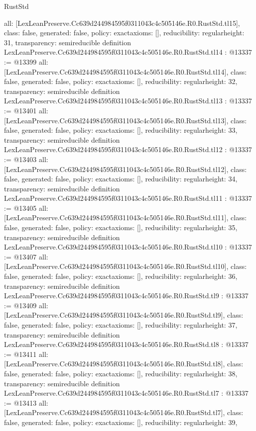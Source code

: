 \begin{lexlean}{RustStd}
\begin{coremodule}
{  all: [LexLeanPreserve.Cc639d244984595f0311043c4c505146e.R0.RustStd.tl15],
  class: false,
  generated: false,
  policy: exact{axioms: []},
  reducibility: regular{height: 31},
  transparency: semireducible
}
definition LexLeanPreserve.Cc639d244984595f0311043c4c505146e.R0.RustStd.tl14 : @13337 := @13399 {
  all: [LexLeanPreserve.Cc639d244984595f0311043c4c505146e.R0.RustStd.tl14],
  class: false,
  generated: false,
  policy: exact{axioms: []},
  reducibility: regular{height: 32},
  transparency: semireducible
}
definition LexLeanPreserve.Cc639d244984595f0311043c4c505146e.R0.RustStd.tl13 : @13337 := @13401 {
  all: [LexLeanPreserve.Cc639d244984595f0311043c4c505146e.R0.RustStd.tl13],
  class: false,
  generated: false,
  policy: exact{axioms: []},
  reducibility: regular{height: 33},
  transparency: semireducible
}
definition LexLeanPreserve.Cc639d244984595f0311043c4c505146e.R0.RustStd.tl12 : @13337 := @13403 {
  all: [LexLeanPreserve.Cc639d244984595f0311043c4c505146e.R0.RustStd.tl12],
  class: false,
  generated: false,
  policy: exact{axioms: []},
  reducibility: regular{height: 34},
  transparency: semireducible
}
definition LexLeanPreserve.Cc639d244984595f0311043c4c505146e.R0.RustStd.tl11 : @13337 := @13405 {
  all: [LexLeanPreserve.Cc639d244984595f0311043c4c505146e.R0.RustStd.tl11],
  class: false,
  generated: false,
  policy: exact{axioms: []},
  reducibility: regular{height: 35},
  transparency: semireducible
}
definition LexLeanPreserve.Cc639d244984595f0311043c4c505146e.R0.RustStd.tl10 : @13337 := @13407 {
  all: [LexLeanPreserve.Cc639d244984595f0311043c4c505146e.R0.RustStd.tl10],
  class: false,
  generated: false,
  policy: exact{axioms: []},
  reducibility: regular{height: 36},
  transparency: semireducible
}
definition LexLeanPreserve.Cc639d244984595f0311043c4c505146e.R0.RustStd.tl9 : @13337 := @13409 {
  all: [LexLeanPreserve.Cc639d244984595f0311043c4c505146e.R0.RustStd.tl9],
  class: false,
  generated: false,
  policy: exact{axioms: []},
  reducibility: regular{height: 37},
  transparency: semireducible
}
definition LexLeanPreserve.Cc639d244984595f0311043c4c505146e.R0.RustStd.tl8 : @13337 := @13411 {
  all: [LexLeanPreserve.Cc639d244984595f0311043c4c505146e.R0.RustStd.tl8],
  class: false,
  generated: false,
  policy: exact{axioms: []},
  reducibility: regular{height: 38},
  transparency: semireducible
}
definition LexLeanPreserve.Cc639d244984595f0311043c4c505146e.R0.RustStd.tl7 : @13337 := @13413 {
  all: [LexLeanPreserve.Cc639d244984595f0311043c4c505146e.R0.RustStd.tl7],
  class: false,
  generated: false,
  policy: exact{axioms: []},
  reducibility: regular{height: 39},
}
\end{coremodule}
\end{lexlean}
